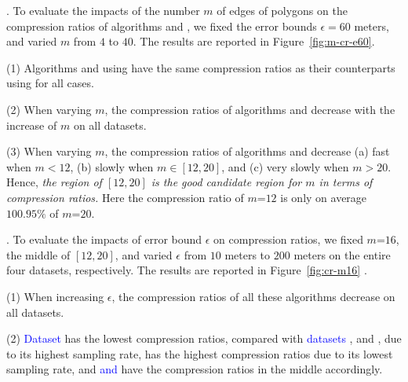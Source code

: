 {%
.
To evaluate the impacts of the number $m$ of edges of polygons on the
compression ratios of algorithms \cist and \cista, we fixed the error bounds {$\epsilon =60$ meters}, and varied $m$ from $4$ to $40$. The results are reported in Figure~\ref{fig:m-cr-e60}.

\ni(1) Algorithms \cist and \cista using \rpia have the same compression ratios as their counterparts using \cpia for all cases.

\ni(2) When varying $m$, the compression ratios of algorithms
{\cist and \cista} decrease with the increase of $m$ on all datasets.

\ni(3) When varying $m$, the compression ratios of algorithms {\cist and \cista} decrease (a) fast when $m < 12$, (b) slowly when $m \in [12, 20]$, and (c) very slowly when $m > 20$. Hence, \emph{the region of $[12, 20]$ is the good candidate region for $m$ in terms of compression ratios.}
Here the compression ratio of $m$=$12$ is only on average {$100.95\%$} of $m$=$20$.



.
To evaluate the impacts of error bound $\epsilon$ on compression ratios, we fixed {$m$=$16$}, the middle of $[12, 20]$, and varied $\epsilon$ from $10$ meters to $200$ meters on the entire four datasets, respectively.
The results are reported in Figure~\ref{fig:cr-m16} .


\ni (1) When increasing $\epsilon$, the compression ratios of all these algorithms decrease on all datasets.

\ni (2) \textcolor{blue}{Dataset} \pricar has the lowest compression ratios, compared with \textcolor{blue}{datasets} \mopsi, \sercar and \geolife, due to its highest sampling rate,
\textcolor{blue}{\sercar} has the highest compression ratios due to its lowest sampling rate, and \textcolor{blue}{\geolife and \mopsi} have the compression ratios in the middle accordingly.

}
